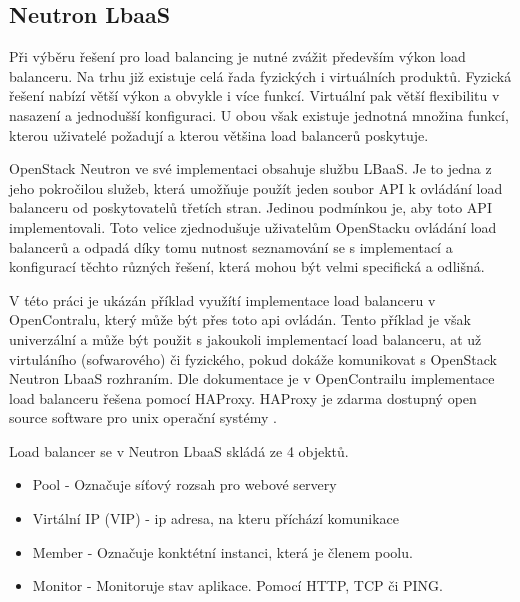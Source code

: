 \subsection{Neutron LbaaS}

Při výběru řešení pro load balancing je nutné zvážit především výkon load balanceru. Na trhu již existuje celá řada fyzických i virtuálních produktů. Fyzická řešení nabízí větší výkon a obvykle i více funkcí. Virtuální pak větší flexibilitu v nasazení a jednodušší konfiguraci. U obou však existuje jednotná množina funkcí, kterou uživatelé požadují a kterou většina load balancerů poskytuje. 

OpenStack Neutron ve své implementaci obsahuje službu LBaaS. Je to jedna z jeho pokročilou služeb, která umožňuje použít jeden soubor API k ovládání load balanceru od poskytovatelů třetích stran. Jedinou podmínkou je, aby toto API implementovali. Toto velice zjednodušuje uživatelům OpenStacku ovládání load balancerů a odpadá díky tomu nutnost seznamování se s implementací a konfigurací těchto různých řešení, která mohou být velmi specifická a odlišná.

V této práci je ukázán příklad využítí implementace load balanceru v OpenContralu, který může být přes toto api ovládán. Tento příklad je však univerzální a může být použit s jakoukoli implementací load balanceru, at už virtuláního (sofwarového) či fyzického, pokud dokáže komunikovat s OpenStack Neutron LbaaS rozhraním. Dle dokumentace \cite{contrail_loadbalancer} je v OpenContrailu implementace load balanceru řešena pomocí HAProxy. HAProxy je zdarma dostupný open source software pro unix operační systémy \cite{HAProxy}. 


Load balancer se v Neutron LbaaS skládá ze 4 objektů.

\begin{itemize}
\item Pool - Označuje síťový rozsah pro webové servery
\item Virtální IP (VIP) - ip adresa, na kteru příchází komunikace
\item Member - Označuje konktétní instanci, která je členem poolu.
\item Monitor - Monitoruje stav aplikace. Pomocí HTTP, TCP či PING.
\end{itemize}

